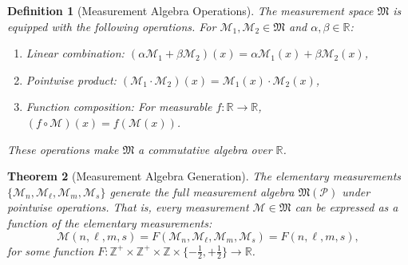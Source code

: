 \documentclass[twocolumn,10pt,a4paper]{article}
\newtheorem{theorem}{Theorem}[section]
\newtheorem{definition}[theorem]{Definition}
\theoremstyle{remark}
\newcommand{\partition}{\mathcal{P}}
\newcommand{\Reals}{\mathbb{R}}
\newcommand{\Integers}{\mathbb{Z}}
\begin{document}
\begin{definition}[Measurement Algebra Operations]
\label{def:measurement_composition}
The measurement space $\mathfrak{M}$ is equipped with the following operations. For $\mathcal{M}_1, \mathcal{M}_2 \in \mathfrak{M}$ and $\alpha, \beta \in \Reals$:
\begin{enumerate}[label=(\roman*), noitemsep]
    \item \emph{Linear combination}: $(\alpha \mathcal{M}_1 + \beta \mathcal{M}_2)(x) = \alpha \mathcal{M}_1(x) + \beta \mathcal{M}_2(x)$,
    \item \emph{Pointwise product}: $(\mathcal{M}_1 \cdot \mathcal{M}_2)(x) = \mathcal{M}_1(x) \cdot \mathcal{M}_2(x)$,
    \item \emph{Function composition}: For measurable $f: \Reals \to \Reals$, $(f \circ \mathcal{M})(x) = f(\mathcal{M}(x))$.
\end{enumerate}
These operations make $\mathfrak{M}$ a commutative algebra over $\Reals$.
\end{definition}

\begin{theorem}[Measurement Algebra Generation]
\label{thm:measurement_algebra}
The elementary measurements $\{\mathcal{M}_n, \mathcal{M}_\ell, \mathcal{M}_m, \mathcal{M}_s\}$ generate the full measurement algebra $\mathfrak{M}(\partition)$ under pointwise operations. That is, every measurement $\mathcal{M} \in \mathfrak{M}$ can be expressed as a function of the elementary measurements:
\begin{equation}
\mathcal{M}(n, \ell, m, s) = F(\mathcal{M}_n, \mathcal{M}_\ell, \mathcal{M}_m, \mathcal{M}_s) = F(n, \ell, m, s),
\end{equation}
for some function $F: \Integers^+ \times \Integers^+ \times \Integers \times \{-\tfrac{1}{2}, +\tfrac{1}{2}\} \to \Reals$.
\end{theorem}
\end{document}
